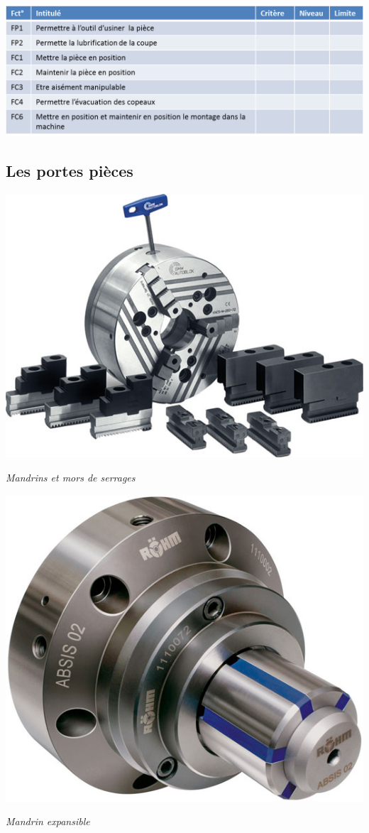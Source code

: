 \documentclass[11pt,oneside]{article}
\begin{document}
\begin{center}
\includegraphics[width=.95\textwidth]{png/af2}
\end{center}


\subsection{Les portes pièces}
\begin{minipage}[c]{.45\linewidth}
\begin{center}
\includegraphics[width=.9\textwidth]{png/mandrin}

\textit{Mandrins et mors de serrages}
\end{center}
\end{minipage}\hfill
\begin{minipage}[c]{.45\linewidth}
\begin{center}
\includegraphics[width=.6\textwidth]{png/mandrin_exp}

\textit{Mandrin expansible}
\end{center}
\end{minipage}
\end{document}
